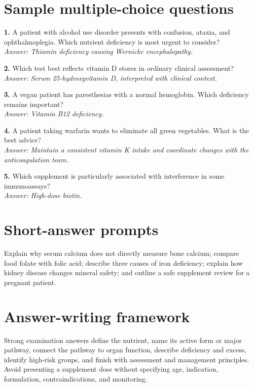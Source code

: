 \section{Sample multiple-choice questions}
\textbf{1.} A patient with alcohol use disorder presents with confusion, ataxia, and ophthalmoplegia. Which nutrient deficiency is most urgent to consider?\\
\textit{Answer: Thiamin deficiency causing Wernicke encephalopathy.}

\textbf{2.} Which test best reflects vitamin D stores in ordinary clinical assessment?\\
\textit{Answer: Serum 25-hydroxyvitamin D, interpreted with clinical context.}

\textbf{3.} A vegan patient has paresthesias with a normal hemoglobin. Which deficiency remains important?\\
\textit{Answer: Vitamin B12 deficiency.}

\textbf{4.} A patient taking warfarin wants to eliminate all green vegetables. What is the best advice?\\
\textit{Answer: Maintain a consistent vitamin K intake and coordinate changes with the anticoagulation team.}

\textbf{5.} Which supplement is particularly associated with interference in some immunoassays?\\
\textit{Answer: High-dose biotin.}

\section{Short-answer prompts}
Explain why serum calcium does not directly measure bone calcium; compare food folate with folic acid; describe three causes of iron deficiency; explain how kidney disease changes mineral safety; and outline a safe supplement review for a pregnant patient.

\section{Answer-writing framework}
Strong examination answers define the nutrient, name its active form or major pathway, connect the pathway to organ function, describe deficiency and excess, identify high-risk groups, and finish with assessment and management principles. Avoid presenting a supplement dose without specifying age, indication, formulation, contraindications, and monitoring.
